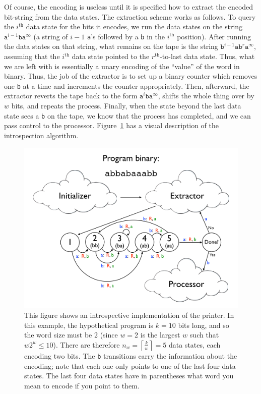 \documentclass[11pt]{article}
\begin{document}
Of course, the encoding is useless until it is specified how to extract the encoded bit-string from the data states. The extraction scheme works as follows. To query the $i^\textrm{th}$ data state for the bits it encodes, we run the data states on the string $\texttt{a}^{i-1}\texttt{b}\texttt{a}^{\infty}$ (a string of $i-1$ \texttt{a}'s followed by a \texttt{b} in the $i^\textrm{th}$ position). After running the data states on that string, what remains on the tape is the string $\texttt{b}^{i-1}\texttt{a}\texttt{b}^r\texttt{a}^{\infty}$, assuming that the $i^\textrm{th}$ data state pointed to the $r^\textrm{th}$-to-last data state. Thus, what we are left with is essentially a unary encoding of the ``value'' of the word in binary. Thus, the job of the extractor is to set up a binary counter which removes one \texttt{b} at a time and increments the counter appropriately. Then, afterward, the extractor reverts the tape back to the form $\texttt{a}^i\texttt{b}\texttt{a}^{\infty}$, shifts the whole thing over by $w$ bits, and repeats the process. Finally, when the state beyond the last data state sees a \texttt{b} on the tape, we know that the process has completed, and we can pass control to the processor. Figure~\ref{fig:introspectprog} has a visual description of the introspection algorithm.

\begin{figure}
\begin{center}
\includegraphics[scale=0.42]{figs/introspectprog.png}
\caption{This figure shows an introspective implementation of the printer. In this example, the hypothetical program is $k=10$ bits long, and so the word size must be 2 (since $w=2$ is the largest $w$ such that $w2^w \le 10$). There are therefore $n_w = \left \lceil{\frac{k}{w}}\right \rceil = 5$ data states, each encoding two bits. The \texttt{b} transitions carry the information about the encoding; note that each one only points to one of the last four data states. The last four data states have in parentheses what word you mean to encode if you point to them. \label{fig:introspectprog}}
\end{center}
\end{figure}
\end{document}
